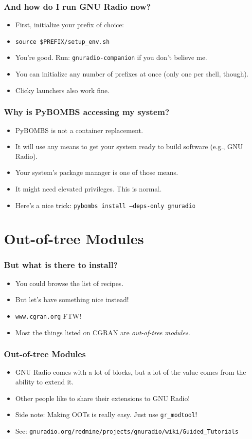 \documentclass{beamer}
\begin{document}
\begin{frame}
  \frametitle{And how do I run GNU Radio now?}
  \begin{itemize}
    \item First, initialize your prefix of choice:
    \item \texttt{source \$PREFIX/setup\_env.sh}
    \item You're good. Run: \texttt{gnuradio-companion} if you don't believe me.
    \item You can initialize any number of prefixes at once (only one per shell, though).
    \item Clicky launchers also work fine.
  \end{itemize}
\end{frame}

\begin{frame}
  \frametitle{Why is PyBOMBS accessing my system?}
  \begin{itemize}
    \item PyBOMBS is not a container replacement.
    \item It will use any means to get your system ready to build software (e.g., GNU Radio).
    \item Your system's package manager is one of those means.
    \item It might need elevated privileges. This is normal.
    \item Here's a nice trick: \texttt{pybombs install --deps-only gnuradio}
  \end{itemize}
\end{frame}

\section{Out-of-tree Modules}
\begin{frame}
  \frametitle{But what is there to install?}
  \begin{itemize}
    \item You could browse the list of recipes.
    \item But let's have something nice instead!
    \item \texttt{www.cgran.org} FTW\@!
    \item Most the things listed on CGRAN are \emph{out-of-tree modules}.
  \end{itemize}
\end{frame}

\begin{frame}
  \frametitle{Out-of-tree Modules}
  \begin{itemize}
    \item GNU Radio comes with a lot of blocks, but a lot of the value comes from the ability to extend it.
    \item Other people like to share their extensions to GNU Radio!
    \item Side note: Making OOTs is really easy. Just use \texttt{gr\_modtool}!
    \item See: \texttt{gnuradio.org/redmine/projects/gnuradio/wiki/Guided\_Tutorials}
  \end{itemize}
\end{frame}
\end{document}
